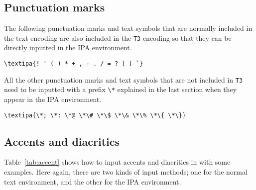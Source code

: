 \subsection{Punctuation marks}

The following punctuation marks and text symbols that are
normally included in the text encoding are also included in the
\texttt{T3} encoding so that they can be directly inputted in the IPA
environment.

\begin{tipaexample}
 \yitem \verb|\textipa{! ' ( ) * + , - . / = ? [ ] `}|
 \yitem {}
\end{tipaexample}

All the other punctuation marks and text symbols that are not included
in \texttt{T3} need to be inputted with a prefix \verb|\*| explained in
the last section when they appear in the IPA environment.

\begin{tipaexample}
 \yitem
   \verb|\textipa{\*; \*: \*@ \*\# \*\$ \*\& \*\% \*\{ \*\}}|
 \yitem {}
\end{tipaexample}

\subsection{Accents and diacritics}

Table~\ref{tab:accent} shows how to input accents and diacritics in
\tipa{} with some examples. Here again, there are two kinds of input
methods; one for the normal text environment, and the other for the
IPA environment.


